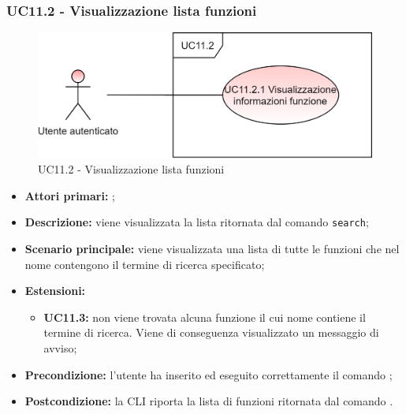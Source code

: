 \subsubsection{UC11.2 - Visualizzazione lista funzioni}
\begin{figure}[H]
	\centering
	\includegraphics[scale=\ucs]{./res/img/UC11-2.png}
	\caption {UC11.2 - Visualizzazione lista funzioni}
\end{figure}
\begin{itemize}
	\item \textbf{Attori primari:} \ua{};
	\item \textbf{Descrizione:} viene visualizzata la lista ritornata dal comando \texttt{search};
	\item \textbf{Scenario principale:} viene visualizzata una lista di tutte le funzioni che nel nome contengono il termine di ricerca specificato;
	\item \textbf{Estensioni:} 
	\begin{itemize}
		\item \textbf{UC11.3:} non viene trovata alcuna funzione il cui nome contiene il termine di ricerca. Viene di conseguenza visualizzato un messaggio di avviso;
	\end{itemize}
	\item \textbf{Precondizione:} l’utente ha inserito ed eseguito correttamente il comando \search{};
	\item \textbf{Postcondizione:} la CLI riporta la lista di funzioni ritornata dal comando \search{}.
\end{itemize}